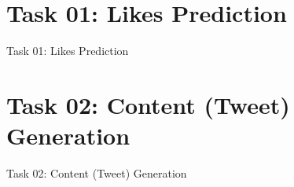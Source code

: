 \documentclass{beamer}
\begin{document}

\section{Task 01: Likes Prediction}
\begin{frame}{Task 01: Likes Prediction}
    
\end{frame}
\section{Task 02: Content (Tweet) Generation}
\begin{frame}{Task 02: Content (Tweet) Generation}
    
 
        

    
\end{frame}
\end{document}
